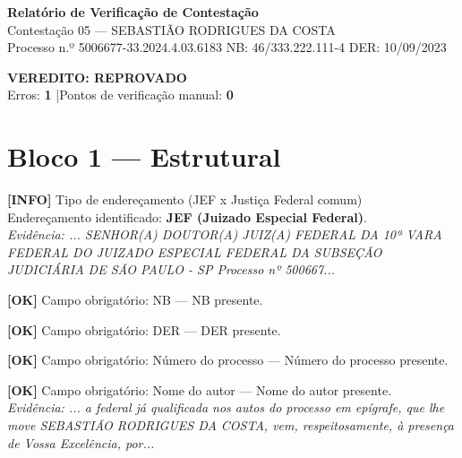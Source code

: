 \documentclass[12pt,a4paper]{article}
\newcommand{\statusOK}[1]{\textcolor{corOK}{\textbf{[OK]}} #1}
\newcommand{\statusINFO}[1]{\textcolor{corINFO}{\textbf{[INFO]}} #1}
\begin{document}
\begin{center}
  {\LARGE \textbf{Relatório de Verificação de Contestação}}\\[0.4em]
  {\large Contestação 05 --- SEBASTIÃO RODRIGUES DA COSTA}\\[0.2em]
  {\small Processo n.º 5006677-33.2024.4.03.6183 \quad NB: 46/333.222.111-4 \quad DER: 10/09/2023}
\end{center}

\vspace{0.5em}

\noindent\colorbox{corFundoReprovado}{%
  \begin{minipage}{\dimexpr\linewidth-2\fboxsep}
    \centering
    \vspace{0.3em}
    {\large \textcolor{corERRO}{\textbf{VEREDITO: REPROVADO}}}\\
    Erros: \textbf{1} \quad|\quad Pontos de verificação manual: \textbf{0}
    \vspace{0.3em}
  \end{minipage}%
}

\vspace{1em}


\section{Bloco 1 --- Estrutural}

\statusINFO{Tipo de endereçamento (JEF x Justiça Federal comum)}\\
Endereçamento identificado: \textbf{JEF (Juizado Especial Federal)}.\\
\textit{Evidência: ... SENHOR(A) DOUTOR(A) JUIZ(A) FEDERAL DA 10ª VARA FEDERAL DO JUIZADO ESPECIAL FEDERAL DA SUBSEÇÃO JUDICIÁRIA DE SÃO PAULO - SP Processo nº 500667...}

\medskip
\statusOK{Campo obrigatório: NB} --- NB presente.

\medskip
\statusOK{Campo obrigatório: DER} --- DER presente.

\medskip
\statusOK{Campo obrigatório: Número do processo} --- Número do processo presente.

\medskip
\statusOK{Campo obrigatório: Nome do autor} --- Nome do autor presente.\\
\textit{Evidência: ... a federal já qualificada nos autos do processo em epígrafe, que lhe move SEBASTIÃO RODRIGUES DA COSTA, vem, respeitosamente, à presença de Vossa Excelência, por...}
\end{document}
